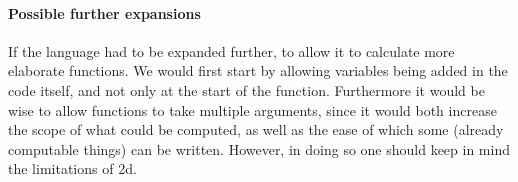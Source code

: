 \paragraph{Possible further expansions}
If the language had to be expanded further, to allow it to calculate
more elaborate functions. We would first start by allowing variables
being added in the code itself, and not only at the start of the
function. Furthermore it would be wise to allow functions to take
multiple arguments, since it would both increase the scope of what
could be computed, as well as the ease of which some (already
computable things) can be written. However, in doing so one should
keep in mind the limitations of 2d.

